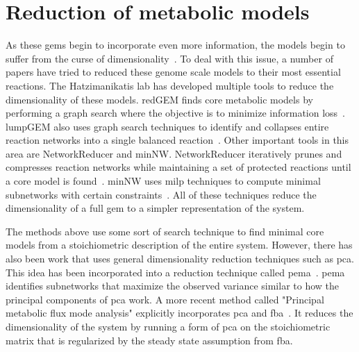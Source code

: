 
\section{Reduction of metabolic models}
As these \glspl{gem} begin to incorporate even more information, the models begin to suffer from the curse of dimensionality~\cite{bellman2013dynamic}.
To deal with this issue, a number of papers have tried to reduced these genome scale models to their most essential reactions.
The Hatzimanikatis lab has developed multiple tools to reduce the dimensionality of these models.
redGEM finds core metabolic models by performing a graph search where the objective is to minimize information loss~\cite{ataman2017redgem}.
lumpGEM also uses graph search techniques to identify and collapses entire reaction networks into a single balanced reaction~\cite{ataman2017lumpgem}.
Other important tools in this area are NetworkReducer and minNW.
NetworkReducer iteratively prunes and compresses reaction networks while maintaining a set of protected reactions until a core model is found~\cite{erdrich2015algorithm}.
minNW uses \gls{milp} techniques to compute minimal subnetworks with certain constraints~\cite{rohl2017mixed}.
All of these techniques reduce the dimensionality of a full \gls{gem} to a simpler representation of the system.

The methods above use some sort of search technique to find minimal core models from a stoichiometric description of the entire system.
However, there has also been work that uses general dimensionality reduction techniques such as \gls{pca}.
This idea has been incorporated into a reduction technique called \gls{pema}~\cite{von2016principal}.
\gls{pema} identifies subnetworks that maximize the observed variance similar to how the principal components of \gls{pca} work.
A more recent method called "Principal metabolic flux mode analysis" explicitly incorporates \gls{pca} and \gls{fba}~\cite{bhadra2017principal}.
It reduces the dimensionality of the system by running a form of \gls{pca} on the stoichiometric matrix that is regularized by the steady state assumption from \gls{fba}.


